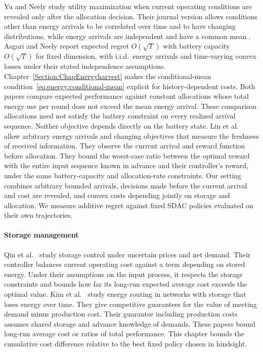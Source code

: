 Yu and Neely \cite{Yu2019} study utility maximization when current
operating conditions are revealed only after the allocation decision.
Their journal version allows conditions other than energy arrivals to be
correlated over time and to have changing distributions, while energy
arrivals are independent and have a common mean
\cite[Sec.~V, Thm.~4]{Yu2019}. Asgari and Neely \cite{10.1145/3428337}
report expected regret $O(\sqrt{T})$ with battery capacity $O(\sqrt{T})$
for fixed dimension, with i.i.d.\ energy arrivals and time-varying convex
losses under their stated independence assumptions.
Chapter~\ref{Section:ChapEnergyharvest} makes the conditional-mean
condition~\eqref{eq:energy:conditional-mean} explicit for history-dependent
costs. Both papers compare expected performance against
constant allocations whose total energy use per round does not exceed the
mean energy arrival. These comparison allocations need not satisfy the
battery constraint on every realized arrival sequence. Neither objective
depends directly on the battery state.
Lin et al.\ \cite{lin2025optimal} allow
arbitrary energy arrivals and changing objectives that measure the freshness
of received information. They observe the current arrival and
reward function before allocation. They bound the worst-case ratio between
the optimal reward with the entire input sequence known in advance and
their controller's reward, under the same battery-capacity and
allocation-rate constraints.
Our setting combines arbitrary bounded arrivals, decisions made before the
current arrival and cost are revealed, and convex costs depending jointly
on storage and allocation. We measure additive regret against fixed SDAC
policies evaluated on their own trajectories.

\paragraph{Storage management}
Qin et al.\ \cite{qin2016online} study storage control under uncertain
prices and net demand. Their controller balances current operating cost
against a term depending on stored energy. Under their assumptions on the
input process, it respects the storage constraints and bounds how far its
long-run expected average cost exceeds the optimal value. Kim et al.\
\cite{kim2016storage} study energy routing in networks with storage that
loses energy over time. They give competitive guarantees for the value of
meeting demand minus production cost. Their guarantee including production
costs assumes shared storage and advance knowledge of demands. These
papers bound long-run average cost or ratios of total performance. This
chapter bounds the cumulative cost difference relative to the best fixed
policy chosen in hindsight.

